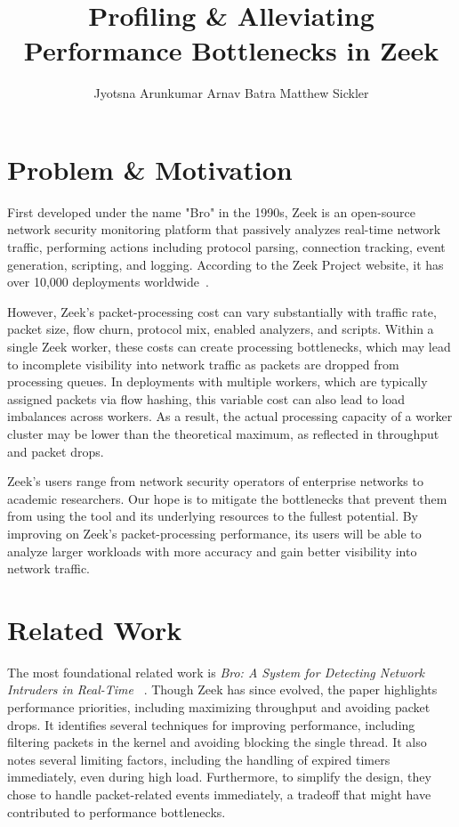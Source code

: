 \documentclass[sigconf, 10pt, nonacm]{acmart}
\title{Profiling \& Alleviating Performance Bottlenecks in Zeek}
\author{Jyotsna Arunkumar \hspace{1cm} Arnav Batra \hspace{1cm} Matthew Sickler}
\affiliation{
  \vspace{0.4em}
  \institution{The University of Texas at Austin}
  \city{Austin}
  \country{USA}
}
\begin{document}
\maketitle

\section{Problem \& Motivation}

First developed under the name "Bro" in the 1990s, Zeek is an open-source network
 security monitoring platform that passively analyzes real-time network traffic, 
 performing actions including protocol parsing, connection tracking, event generation, 
 scripting, and logging. According to the Zeek Project website, it has over 10,000 
 deployments worldwide~\cite{zeek-website}.

However, Zeek's packet-processing cost can vary substantially with traffic rate, 
packet size, flow churn, protocol mix, enabled analyzers, and scripts. Within a 
single Zeek worker, these costs can create processing bottlenecks, which may lead 
to incomplete visibility into network traffic as packets are dropped from processing 
queues. In deployments with multiple workers, which are typically assigned packets via 
flow hashing, this variable cost can also lead to load imbalances across workers.
 As a result, the actual processing capacity of a worker cluster may be lower than
 the theoretical maximum, as reflected in throughput and packet drops.

Zeek's users range from network security operators of enterprise networks to
academic researchers. Our hope is to mitigate the bottlenecks that prevent them
from using the tool and its underlying resources to the fullest potential. By
improving on Zeek's packet-processing performance, its users will be able to
analyze larger workloads with more accuracy and gain better visibility into
network traffic.

\section{Related Work}

The most foundational related work is
\textit{Bro: A System for Detecting Network Intruders in Real-Time} ~\cite{paxson98}. Though
Zeek has since evolved, the paper highlights performance priorities, including
maximizing throughput and avoiding packet drops. It identifies several
techniques for improving performance, including filtering packets in the kernel
and avoiding blocking the single thread. It also
notes several limiting factors, including the handling of expired timers 
immediately, even during high load. Furthermore, to simplify the design, 
they chose to handle packet-related events immediately, a tradeoff that might have contributed to 
performance bottlenecks.
\end{document}
